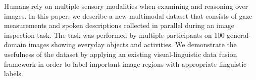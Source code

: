 Humans rely on multiple sensory modalities when examining and reasoning over images. In this paper, we describe a new multimodal dataset that consists of gaze measurements and spoken descriptions collected in parallel during an image inspection task. The task was performed by multiple participants on 100 general-domain images showing everyday objects and activities. We demonstrate the usefulness of the dataset by applying an existing visual-linguistic data fusion framework in order to label important image regions with appropriate linguistic labels.

